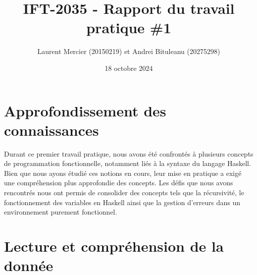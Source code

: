 \documentclass{article}
\title{IFT-2035 - Rapport du travail pratique \#1}
\author{Laurent Mercier (20150219) et Andrei Bituleanu (20275298)}
\date{18 octobre 2024}
\begin{document}
\maketitle

\newcommand \mML {\ensuremath\mu\textsl{ML}}
\newcommand \kw [1] {\textsf{#1}}
\newcommand \id [1] {\textsl{#1}}
\newcommand \punc [1] {\kw{`#1'}}
\newcommand \str [1] {\texttt{"#1"}}
\newenvironment{outitemize}{
  \begin{itemize}
  \let \origitem \item \def \item {\origitem[]\hspace{-18pt}}
}{
  \end{itemize}
}
\newcommand \Align [2][t] {\begin{array}[#1]{@{}l} #2 \end{array}}

\section{Approfondissement des connaissances}

\noindent Durant ce premier travail pratique, nous avons été confrontés à plusieurs concepts de programmation fonctionnelle, notamment liés à la syntaxe du langage Haskell. Bien que nous ayons étudié ces notions en cours, leur mise en pratique a exigé une compréhension plus approfondie des concepts. Les défis que nous avons rencontrés nous ont permis de consolider des concepts tels que la récursivité, le fonctionnement des variables en Haskell ainsi que la gestion d'erreurs dans un environnement purement fonctionnel.

\section{Lecture et compréhension de la donnée}
\end{document}
